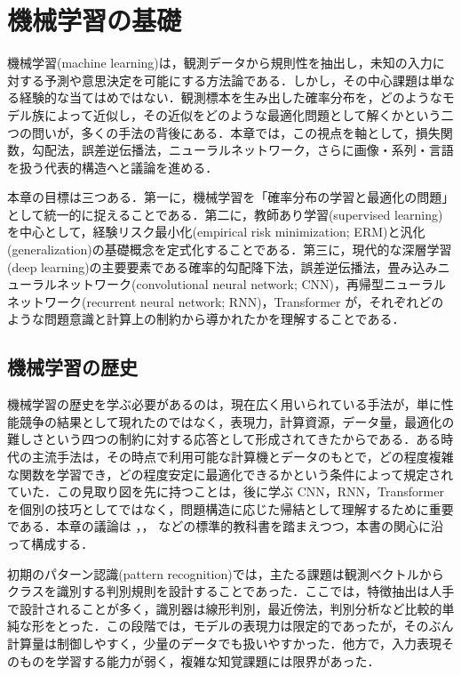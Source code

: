 \section{機械学習の基礎}

機械学習(machine learning)は，観測データから規則性を抽出し，未知の入力に対する予測や意思決定を可能にする方法論である．しかし，その中心課題は単なる経験的な当てはめではない．観測標本を生み出した確率分布を，どのようなモデル族によって近似し，その近似をどのような最適化問題として解くかという二つの問いが，多くの手法の背後にある．本章では，この視点を軸として，損失関数，勾配法，誤差逆伝播法，ニューラルネットワーク，さらに画像・系列・言語を扱う代表的構造へと議論を進める．

本章の目標は三つある．第一に，機械学習を「確率分布の学習と最適化の問題」として統一的に捉えることである．第二に，教師あり学習(supervised learning)を中心として，経験リスク最小化(empirical risk minimization; ERM)と汎化(generalization)の基礎概念を定式化することである．第三に，現代的な深層学習(deep learning)の主要要素である確率的勾配降下法，誤差逆伝播法，畳み込みニューラルネットワーク(convolutional neural network; CNN)，再帰型ニューラルネットワーク(recurrent neural network; RNN)，Transformer が，それぞれどのような問題意識と計算上の制約から導かれたかを理解することである．

\subsection{機械学習の歴史}
機械学習の歴史を学ぶ必要があるのは，現在広く用いられている手法が，単に性能競争の結果として現れたのではなく，表現力，計算資源，データ量，最適化の難しさという四つの制約に対する応答として形成されてきたからである．ある時代の主流手法は，その時点で利用可能な計算機とデータのもとで，どの程度複雑な関数を学習でき，どの程度安定に最適化できるかという条件によって規定されていた．この見取り図を先に持つことは，後に学ぶ CNN，RNN，Transformer を個別の技巧としてではなく，問題構造に応じた帰結として理解するために重要である．本章の議論は \citet{Bishop2006}，\citet{Murphy2012}，\citet{Goodfellow2016} などの標準的教科書を踏まえつつ，本書の関心に沿って構成する．

初期のパターン認識(pattern recognition)では，主たる課題は観測ベクトルからクラスを識別する判別規則を設計することであった．ここでは，特徴抽出は人手で設計されることが多く，識別器は線形判別，最近傍法，判別分析など比較的単純な形をとった．この段階では，モデルの表現力は限定的であったが，そのぶん計算量は制御しやすく，少量のデータでも扱いやすかった．他方で，入力表現そのものを学習する能力が弱く，複雑な知覚課題には限界があった．

